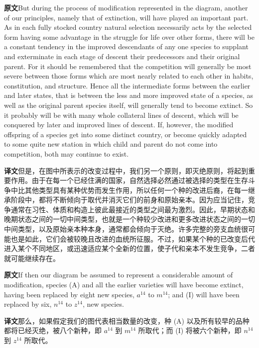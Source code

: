 \documentclass[UTF8,zihao=-4]{ctexart}
\newcommand{\BodyFont}{\fontsize{10.5pt}{15.5pt}\selectfont}
\newcommand{\origlabel}{\textbf{原文}\quad}
\newcommand{\translabel}{\textbf{译文}\quad}
\newenvironment{enblock}{\par\noindent\begingroup\BodyFont\origlabel}{\par\endgroup}
\newenvironment{zhblock}{\par\noindent\begingroup\BodyFont\translabel}{\par\endgroup\vspace{0.35em}}
\newcommand{\pair}[2]{\begin{enblock}#1\end{enblock}\begin{zhblock}#2\end{zhblock}}
\begin{document}
\pair{But during the process of modification represented in the diagram, another of our principles, namely that of extinction, will have played an important part. As in each fully stocked country natural selection necessarily acts by the selected form having some advantage in the struggle for life over other forms, there will be a constant tendency in the improved descendants of any one species to supplant and exterminate in each stage of descent their predecessors and their original parent. For it should be remembered that the competition will generally be most severe between those forms which are most nearly related to each other in habits, constitution, and structure. Hence all the intermediate forms between the earlier and later states, that is between the less and more improved state of a species, as well as the original parent species itself, will generally tend to become extinct. So it probably will be with many whole collateral lines of descent, which will be conquered by later and improved lines of descent. If, however, the modified offspring of a species get into some distinct country, or become quickly adapted to some quite new station in which child and parent do not come into competition, both may continue to exist.}{但是，在图中所表示的改变过程中，我们另一个原则，即灭绝原则，将起到重要作用。由于在每一个已经住满的国家，自然选择必然通过被选择的类型在生存斗争中比其他类型具有某种优势而发生作用，所以任何一个种的改进后裔，在每一继承阶段中，都将不断倾向于取代并消灭它们的前身和原始亲本。因为应当记住，竞争通常在习性、体质和构造上彼此最接近的类型之间最为激烈。因此，早期状态和晚期状态之间的一切中间类型，也就是一个种较少改进和更多改进状态之间的一切中间类型，以及原始亲本种本身，通常都会倾向于灭绝。许多完整的旁支血统很可能也是如此，它们会被较晚且改进的血统所征服。不过，如果某个种的已改变后代进入某个不同地区，或迅速适应某个全新的位置，使子代和亲本不发生竞争，二者就可能继续存在。}

\pair{If then our diagram be assumed to represent a considerable amount of modification, species (A) and all the earlier varieties will have become extinct, having been replaced by eight new species, $a^{14}$ to $m^{14}$; and (I) will have been replaced by six, $n^{14}$ to $z^{14}$, new species.}{那么，如果假定我们的图代表相当数量的改变，种 (A) 以及所有较早的品种都将已经灭绝，被八个新种，即 $a^{14}$ 到 $m^{14}$ 所取代；而 (I) 将被六个新种，即 $n^{14}$ 到 $z^{14}$ 所取代。}
\end{document}
